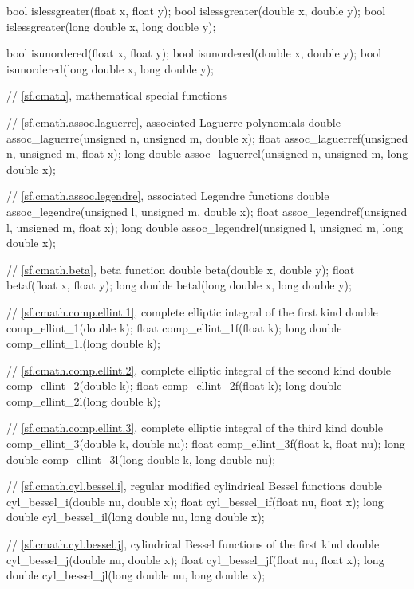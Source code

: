 \begin{codeblock}
{  bool islessgreater(float x, float y);
  bool islessgreater(double x, double y);
  bool islessgreater(long double x, long double y);

  bool isunordered(float x, float y);
  bool isunordered(double x, double y);
  bool isunordered(long double x, long double y);

  // \ref{sf.cmath}, mathematical special functions

  // \ref{sf.cmath.assoc.laguerre}, associated Laguerre polynomials
  double       assoc_laguerre(unsigned n, unsigned m, double x);
  float        assoc_laguerref(unsigned n, unsigned m, float x);
  long double  assoc_laguerrel(unsigned n, unsigned m, long double x);

  // \ref{sf.cmath.assoc.legendre}, associated Legendre functions
  double       assoc_legendre(unsigned l, unsigned m, double x);
  float        assoc_legendref(unsigned l, unsigned m, float x);
  long double  assoc_legendrel(unsigned l, unsigned m, long double x);

  // \ref{sf.cmath.beta}, beta function
  double       beta(double x, double y);
  float        betaf(float x, float y);
  long double  betal(long double x, long double y);

  // \ref{sf.cmath.comp.ellint.1}, complete elliptic integral of the first kind
  double       comp_ellint_1(double k);
  float        comp_ellint_1f(float k);
  long double  comp_ellint_1l(long double k);

  // \ref{sf.cmath.comp.ellint.2}, complete elliptic integral of the second kind
  double       comp_ellint_2(double k);
  float        comp_ellint_2f(float k);
  long double  comp_ellint_2l(long double k);

  // \ref{sf.cmath.comp.ellint.3}, complete elliptic integral of the third kind
  double       comp_ellint_3(double k, double nu);
  float        comp_ellint_3f(float k, float nu);
  long double  comp_ellint_3l(long double k, long double nu);

  // \ref{sf.cmath.cyl.bessel.i}, regular modified cylindrical Bessel functions
  double       cyl_bessel_i(double nu, double x);
  float        cyl_bessel_if(float nu, float x);
  long double  cyl_bessel_il(long double nu, long double x);

  // \ref{sf.cmath.cyl.bessel.j}, cylindrical Bessel functions of the first kind
  double       cyl_bessel_j(double nu, double x);
  float        cyl_bessel_jf(float nu, float x);
  long double  cyl_bessel_jl(long double nu, long double x);

}
\end{codeblock}
